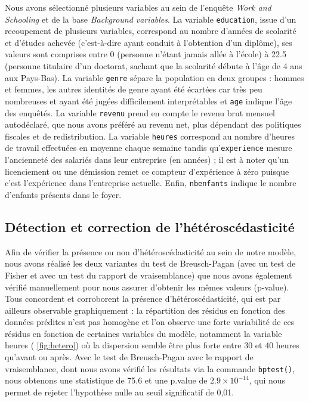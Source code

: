 \documentclass[a4paper, french, 11 pt]{article}\usepackage[]{graphicx}\usepackage[]{xcolor}
\begin{document}
Nous avons sélectionné plusieurs variables au sein de l’enquête \textit{Work and Schooling} et de la base \textit{Background variables}. La variable \verb+education+, issue d’un recoupement de plusieurs variables, correspond au nombre d’années de scolarité et d’études achevée (c’est-à-dire ayant conduit à l’obtention d’un diplôme), ses valeurs sont comprises entre 0 (personne n’étant jamais allée à l’école) à 22.5 (personne titulaire d’un doctorat, sachant que la scolarité débute à l’âge de 4 ans aux Pays-Bas). La variable \verb+genre+ sépare la population en deux groupes : hommes et femmes, les autres identités de genre ayant été écartées car très peu nombreuses et ayant été jugées difficilement interprétables et \verb+age+ indique l’âge des enquêtés. La variable \verb+revenu+ prend en compte le revenu brut mensuel autodéclaré, que nous avons préféré au revenu net, plus dépendant des politiques fiscales et de redistribution. La variable \verb+heures+ correspond au nombre d’heures de travail effectuées en moyenne chaque semaine tandis qu’\verb+experience+ mesure l’ancienneté des salariés dans leur entreprise (en années) ; il est à noter qu’un licenciement ou une démission remet ce compteur d’expérience à zéro puisque c’est l’expérience dans l’entreprise actuelle. Enfin, \verb+nbenfants+ indique le nombre d’enfants présents dans le foyer. 

\subsection{Détection et correction de l’hétéroscédasticité}





Afin de vérifier la présence ou non d’hétéroscédasticité au sein de notre modèle, nous avons réalisé les deux variantes du test de Breusch-Pagan (avec un test de Fisher et avec un test du rapport de vraisemblance) que nous avons également vérifié manuellement pour nous assurer d’obtenir les mêmes valeurs (p-value). Tous concordent et corroborent la présence d’hétéroscédasticité, qui est par ailleurs observable graphiquement : la répartition des résidus en fonction des données prédites n’est pas homogène et l’on observe une forte variabilité de ces résidus en fonction de certaines variables du modèle, notamment la variable heures ( \ref{fig:hetero}) où la dispersion semble être plus forte entre 30 et 40 heures qu’avant ou après. Avec le test de Breusch-Pagan avec le rapport de vraisemblance, dont nous avons vérifié les résultats via la commande \verb+bptest()+, nous obtenons une statistique de 75.6 et une p.value de \ensuremath{2.9\times 10^{-14}}, qui nous permet de rejeter l’hypothèse nulle au seuil significatif de 0,01. 
\end{document}
